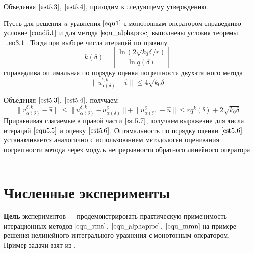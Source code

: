 Объединяя $\eqref{est5.3}$, $\eqref{est5.4}$, приходим к следующему утверждению.
\begin{theorem}\label{teo5.1}
	Пусть для решения $\hat{u}$ уравнения $\eqref{equ1}$ с монотонным оператором справедливо условие $\eqref{cond5.1}$ и для метода $\eqref{equ_alphaproc}$ выполнены условия теоремы $\ref{teo3.1}$. Тогда при выборе числа итераций по правилу
	\begin{equation}\label{equ5.5}
	k(\delta)=\left[\frac{\ln(2\sqrt{k_0\delta}/r)}{\ln q(\delta)}\right]
	\end{equation}
	справедлива оптимальная по порядку оценка погрешности двухэтапного метода
	\begin{equation}\label{est5.6}
	\|u_{\alpha(\delta)}^{\delta, k}-\hat{u}\|\le 4\sqrt{k_0 \delta}
	\end{equation}
\end{theorem}
\proof Объединяя $\eqref{est5.3}$, $\eqref{est5.4}$, получаем
\begin{equation}\label{est5.7}
\|u_{\alpha(\delta)}^{\delta, k}-\hat{u}\|\le\|u_{\alpha(\delta)}^{\delta, k}-u_{\alpha(\delta)}^{\delta}\|+\|u_{\alpha(\delta)}^{\delta}-\hat{u}\|\le rq^k(\delta)+ 2\sqrt{k_0\delta}
\end{equation}
Приравнивая слагаемые в правой части $\eqref{est5.7}$, получаем выражение для числа итераций $\eqref{equ5.5}$ и оценку $\eqref{est5.6}$. Оптимальность по порядку оценки $\eqref{est5.6}$ устанавливается аналогично \cite{Vasin2015} с использованием методологии оценивания погрешности метода через модуль непрерывности обратного линейного оператора \cite{Ivanov1974, IvaVasTan2002}.

\newpage
\section{Численные эксперименты}

{\bfseries Цель} экспериментов --- продемонстрировать практическую применимость итерационных методов $\eqref{equ_rmn}$, $\eqref{equ_alphaproc}$, $\eqref{equ_mmn}$ на примере решения нелинейного интегрального уравнения с монотонным оператором. Пример задачи взят из \cite{Tau2002}.

